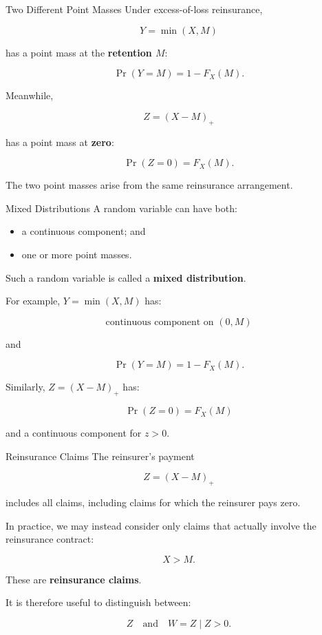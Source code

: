 \documentclass[
  ignorenonframetext,
  aspectratio=169,
]{beamer}
\providecommand{\tightlist}{%
  \setlength{\itemsep}{0pt}\setlength{\parskip}{0pt}}
\begin{document}
\begin{frame}{Two Different Point Masses}
\protect{}\label{two-different-point-masses}
Under excess-of-loss reinsurance,

\[
Y=\min(X,M)
\]

has a point mass at the \textbf{retention \(M\)}:

\[
\Pr(Y=M)=1-F_X(M).
\]

Meanwhile,

\[
Z=(X-M)_+
\]

has a point mass at \textbf{zero}:

\[
\Pr(Z=0)=F_X(M).
\]

The two point masses arise from the same reinsurance arrangement.
\end{frame}

\begin{frame}{Mixed Distributions}
\protect{}\label{mixed-distributions}
A random variable can have both:

\begin{itemize}
\tightlist
\item
  a continuous component; and
\item
  one or more point masses.
\end{itemize}

Such a random variable is called a \textbf{mixed distribution}.

For example, \(Y=\min(X,M)\) has:

\[
\text{continuous component on }(0,M)
\]

and

\[
\Pr(Y=M)=1-F_X(M).
\]

Similarly, \(Z=(X-M)_+\) has:

\[
\Pr(Z=0)=F_X(M)
\]

and a continuous component for \(z>0\).
\end{frame}

\begin{frame}{Reinsurance Claims}
\protect{}\label{reinsurance-claims}
The reinsurer's payment

\[
Z=(X-M)_+
\]

includes all claims, including claims for which the reinsurer pays zero.

In practice, we may instead consider only claims that actually involve
the reinsurance contract:

\[
X>M.
\]

These are \textbf{reinsurance claims}.

It is therefore useful to distinguish between:

\[
Z
\quad\text{and}\quad
W=Z\mid Z>0.
\]
\end{frame}
\end{document}
